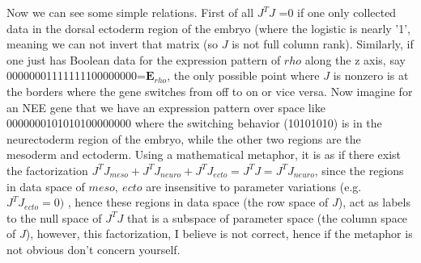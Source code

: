 Now we can see some simple relations. First of all $J^TJ$ =0 if one only collected data in the dorsal ectoderm region of the embryo (where the logistic is nearly '1', meaning we can not invert that matrix (so $J$ is not full column rank).  Similarly, if one just has Boolean data for the expression pattern of $rho$ along the z axis, say 00000001111111100000000=$\bm{E}_{rho}$, the only possible point where $J$ is nonzero is at the borders  where the gene switches from off to on or vice versa.  Now imagine for an NEE gene that we have an expression pattern over space like 0000000101010100000000 where the switching behavior (10101010) is in the neurectoderm region of the embryo, while the other two regions are the mesoderm and ectoderm.  Using a mathematical metaphor, it is as if there exist the factorization $J^TJ_{meso} + J^TJ_{neuro} + J^TJ_{ecto} =J^TJ = J^TJ_{neuro}$, since the regions in data space of $meso, \ ecto$ are insensitive to parameter variations (e.g. $J^TJ_{ecto}=0)$ , hence these regions in data space (the row space of $J$), act as labels to the null space of $J^TJ$ that is a subspace of parameter space (the column space of $J$), however, this factorization, I believe is not correct, hence if the metaphor is not obvious don't concern yourself. 





